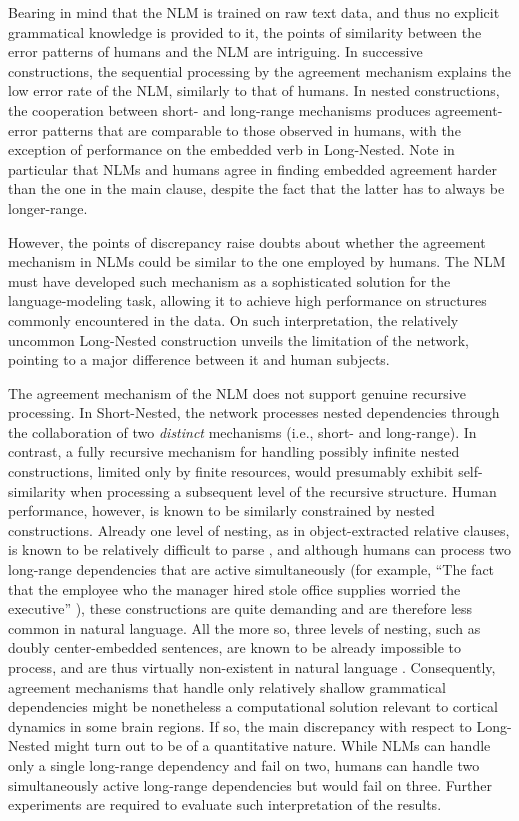 Bearing in mind that the NLM is trained on raw text data, and thus no explicit grammatical knowledge is provided to it, the points of similarity between the error patterns of humans and the NLM are intriguing. In successive constructions, the sequential processing by the agreement mechanism explains the low error rate of the NLM, similarly to that of humans. In nested constructions, the cooperation between short- and long-range mechanisms produces agreement-error patterns that are comparable to those observed in humans, with the exception of performance on the embedded verb in Long-Nested.  Note in particular that NLMs and humans agree in finding embedded agreement harder than the one in the main clause, despite the fact that the latter has to always be longer-range.

However, the points of discrepancy raise doubts about whether the agreement mechanism in NLMs could be similar to the one employed by humans. The NLM must have developed such mechanism as a sophisticated solution for the language-modeling task, allowing it to achieve high performance on structures commonly encountered in the data. On such interpretation, the relatively uncommon Long-Nested  construction unveils the limitation of the network, pointing to a major difference between it and human subjects.

The agreement mechanism of the NLM does not support genuine recursive processing. In Short-Nested, the network processes nested dependencies through the collaboration of two \textit{distinct} mechanisms (i.e., short- and long-range). In contrast, a fully recursive mechanism for handling possibly infinite nested constructions, limited only by finite resources, would presumably exhibit self-similarity when processing a subsequent level of the recursive structure. Human performance, however, is known to be similarly constrained by nested constructions. Already one level of nesting, as in object-extracted relative clauses, is known to be relatively difficult to parse \citep[e.g.,][]{traxler2002processing}, and although humans can process two long-range dependencies that are active simultaneously (for example, ``The fact that the employee who the manager hired stole office supplies worried the executive'' \citep{Gibson:1998}), these constructions are quite demanding and are therefore less common in natural language. All the more so, three levels of nesting, such as doubly center-embedded sentences, are known to be already impossible to process, and are thus virtually non-existent in natural language \citep{karlsson2007constraints}. Consequently, agreement mechanisms that handle only relatively shallow grammatical dependencies might be nonetheless a computational solution relevant to cortical dynamics in some brain regions. If so, the main discrepancy with respect to Long-Nested might turn out to be of a quantitative nature. While NLMs can handle only a single long-range dependency and fail on two, humans can handle two simultaneously active long-range dependencies but would fail on three. Further experiments are required to evaluate such interpretation of the results.


